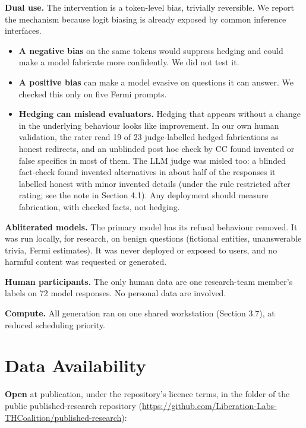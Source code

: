 \documentclass[11pt,letterpaper]{article}
\providecommand{\tightlist}{\setlength{\itemsep}{0pt}\setlength{\parskip}{0pt}}
\DeclareRobustCommand{\_}{\textunderscore\allowbreak}
\begin{document}
\textbf{Dual use.} The intervention is a token-level bias, trivially reversible. We report the mechanism because logit biasing is already exposed by common inference interfaces.

\begin{itemize}
\tightlist
\item
  \textbf{A negative bias} on the same tokens would suppress hedging and could make a model fabricate more confidently. We did not test it.
\item
  \textbf{A positive bias} can make a model evasive on questions it can answer. We checked this only on five Fermi prompts.
\item
  \textbf{Hedging can mislead evaluators.} Hedging that appears without a change in the underlying behaviour looks like improvement. In our own human validation, the rater read 19 of 23 judge-labelled hedged fabrications as honest redirects, and an unblinded post hoc check by CC found invented or false specifics in most of them. The LLM judge was misled too: a blinded fact-check found invented alternatives in about half of the responses it labelled honest with minor invented details (under the rule restricted after rating; see the note in Section 4.1). Any deployment should measure fabrication, with checked facts, not hedging.
\end{itemize}

\textbf{Abliterated models.} The primary model has its refusal behaviour removed. It was run locally, for research, on benign questions (fictional entities, unanswerable trivia, Fermi estimates). It was never deployed or exposed to users, and no harmful content was requested or generated.

\textbf{Human participants.} The only human data are one research-team member's labels on 72 model responses. No personal data are involved.

\textbf{Compute.} All generation ran on one shared workstation (Section 3.7), at reduced scheduling priority.

\hypertarget{data-availability}{%
\section*{Data Availability}\label{data-availability}}

\textbf{Open} at publication, under the repository's licence terms, in the  folder of the public published-research repository (\url{https://github.com/Liberation-Labs-THCoalition/published-research}):
\end{document}
